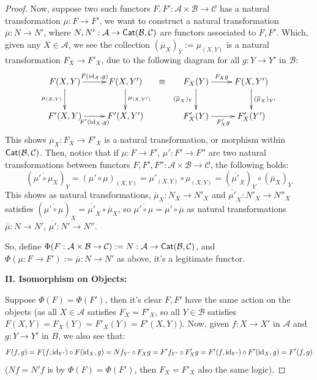 \documentclass{article}
\begin{document}
\begin{proof}
    \hfil

    Now, suppose two such functors $F,F':\mathcal{A}\times\mathcal{B}\rightarrow\mathcal{C}$ has a natural transformation $\mu:F\rightarrow F'$, we want to construct a natural transformation $\overline{\mu}:N\rightarrow N'$, where $N,N':\mathcal{A}\rightarrow \mathsf{Cat}(\mathcal{B},\mathcal{C})$ are functors associated to $F,F'$. Which, given any $X\in\mathcal{A}$, we see the collection $(\overline{\mu}_X)_Y:= \mu_{(X,Y)}$ is a natural transformation $F_X\rightarrow F'_X$, due to the following diagram for all $g:Y\rightarrow Y'$ in $\mathcal{B}$:
    \[\xymatrix{
        F(X,Y) \ar[d]_-{\mu_{(X,Y)}} \ar[r]^-{F(\id_X,g)} & F(X,Y') \ar[d]^-{\mu_{(X,Y')}}\\
        F'(X,Y)\ar[r]_-{F'(\id_X,g)} & F'(X,Y')
    }\ \equiv\ \xymatrix{
        F_X(Y) \ar[d]_-{(\overline{\mu}_X)_Y} \ar[r]^-{F_Xg} & F(X,Y') \ar[d]^-{(\overline{\mu}_X)_{Y'}}\\
        F'_X(Y)\ar[r]_-{F'_Xg} & F'_X(Y')
    }\]
    This shows $\overline{\mu}_X:F_X\rightarrow F'_X$ is a natural transformation, or morphism within $\mathsf{Cat}(\mathcal{B},\mathcal{C})$. Then, notice that if $\mu:F\rightarrow F'$, $\mu':F'\rightarrow F''$ are two natural transformations between functors $F,F',F'':\mathcal{A}\times\mathcal{B}\rightarrow\mathcal{C}$, the following holds:
    \[(\overline{\mu'\circ\mu}_X)_Y = (\mu'\circ\mu)_{(X,Y)} = \mu'_{(X,Y)}\circ \mu_{(X,Y)} = (\overline{\mu'}_X)_Y\circ (\overline{\mu}_X)_Y\]
    This shows as natural transformations, $\overline{\mu}_X:N_X\rightarrow N'_X$ and $\overline{\mu'}_X:N'_X\rightarrow N''_X$ satisfies $(\overline{\mu'\circ\mu})_X=\overline{\mu'}_X\circ \overline{\mu}_X$, so $\overline{\mu'\circ\mu} = \overline{\mu'}\circ \overline{\mu}$ as natural transformations $\overline{\mu}:N\rightarrow N'$, $\overline{\mu'}:N'\rightarrow N''$.

    So, define $\Phi(F:\mathcal{A}\times\mathcal{B}\rightarrow\mathcal{C}):= N:\mathcal{A}\rightarrow \mathsf{Cat}(\mathcal{B},\mathcal{C})$, and $\Phi(\mu:F\rightarrow F'):= \overline{\mu}:N\rightarrow N'$ as above, it's a legitimate functor.

    \hfil

    \textbf{II. Isomorphism on Objects:}

    Suppose $\Phi(F)=\Phi(F')$, then it's clear $F,F'$ have the same action on the objects (as all $X\in\mathcal{A}$ satisfies $F_X = F'_X$, so all $Y\in\mathcal{B}$ satisfies $F(X,Y)=F_X(Y)=F'_X(Y)=F'(X,Y)$). Now, given $f:X\rightarrow X'$ in $\mathcal{A}$ and $g:Y\rightarrow Y'$ in $B$, we also see that:
    \[F(f,g)=F(f,\mathrm{id}_{Y'})\circ F(\mathrm{id}_X,g) = Nf_{Y'}\circ F_{X}g = F'f_{Y'}\circ F'_Xg = F'(f,\mathrm{id}_{Y'})\circ F'(\mathrm{id}_X,g) = F'(f,g)\]
    ($Nf=N'f$ is by $\Phi(F)=\Phi(F')$, then $F_X=F'_X$ also the same logic).


\end{proof}
\end{document}
